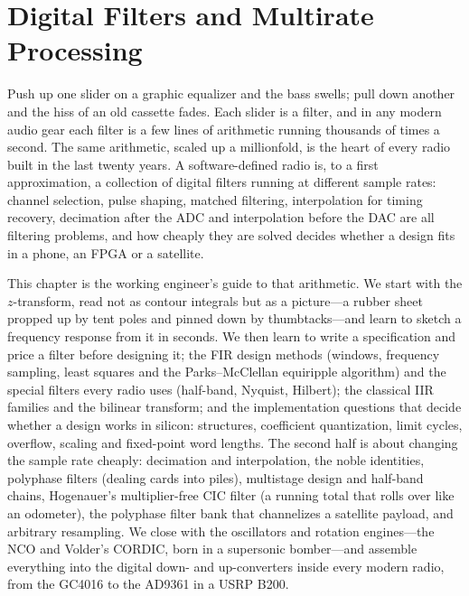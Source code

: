 \chapter{Digital Filters and Multirate Processing}
\label{ch:dsp}

\begin{chapterintro}
Push up one slider on a graphic equalizer and the bass swells; pull down another and the hiss
of an old cassette fades. Each slider is a filter, and in any modern audio gear each filter is
a few lines of arithmetic running thousands of times a second. The same arithmetic, scaled up a
millionfold, is the heart of every radio built in the last twenty years. A software-defined
radio is, to a first approximation, a collection of digital filters running at different sample
rates: channel selection, pulse shaping, matched filtering, interpolation for timing recovery,
decimation after the ADC and interpolation before the DAC are all filtering problems, and how
cheaply they are solved decides whether a design fits in a phone, an FPGA or a satellite.

This chapter is the working engineer's guide to that arithmetic. We start with the
$z$-transform, read not as contour integrals but as a picture---a rubber sheet propped up by
tent poles and pinned down by thumbtacks---and learn to sketch a frequency response from it in
seconds. We then learn to write a specification and price a filter before designing it; the FIR
design methods (windows, frequency sampling, least squares and the Parks--McClellan equiripple
algorithm) and the special filters every radio uses (half-band, Nyquist, Hilbert); the classical
IIR families and the bilinear transform; and the implementation questions that decide whether a
design works in silicon: structures, coefficient quantization, limit cycles, overflow, scaling
and fixed-point word lengths. The second half is about changing the sample rate cheaply:
decimation and interpolation, the noble identities, polyphase filters (dealing cards into
piles), multistage design and half-band chains, Hogenauer's multiplier-free CIC filter (a
running total that rolls over like an odometer), the polyphase filter bank that channelizes a
satellite payload, and arbitrary resampling. We close with the oscillators and rotation
engines---the NCO and Volder's CORDIC, born in a supersonic bomber---and assemble everything into
the digital down- and up-converters inside every modern radio, from the GC4016 to the AD9361 in
a USRP B200.
\end{chapterintro}

